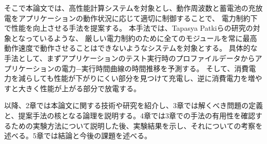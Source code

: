 そこで本論文では、高性能計算システムを対象とし、動作周波数と蓄電池の充放電をアプリケーションの動作状況に応じて適切に制御することで、
電力制約下で性能を向上させる手法を提案する。
本手法では、Tapasya Patkiらの研究\cite{Patki:2013:EHO:2464996.2465009}の対象となっているような、
厳しい電力制約のために全てのモジュールを常に最高動作速度で動作させることはできないようなシステムを対象とする。
具体的な手法として、まずアプリケーションのテスト実行時のプロファイルデータからアプリケーションの電力−実行時間曲線の時間推移を予測する。
そして、消費電力を減らしても性能が下がりにくい部分を見つけて充電し、逆に消費電力を増やすと大きく性能が上がる部分で放電する。


以降、2章では本論文に関する技術や研究を紹介し、3章では解くべき問題の定義と、提案手法の核となる論理を説明する。4章では3章での手法の有用性を確認するための実験方法について説明した後、実験結果を示し、それについての考察を述べる。5章では結論と今後の課題を述べる。







